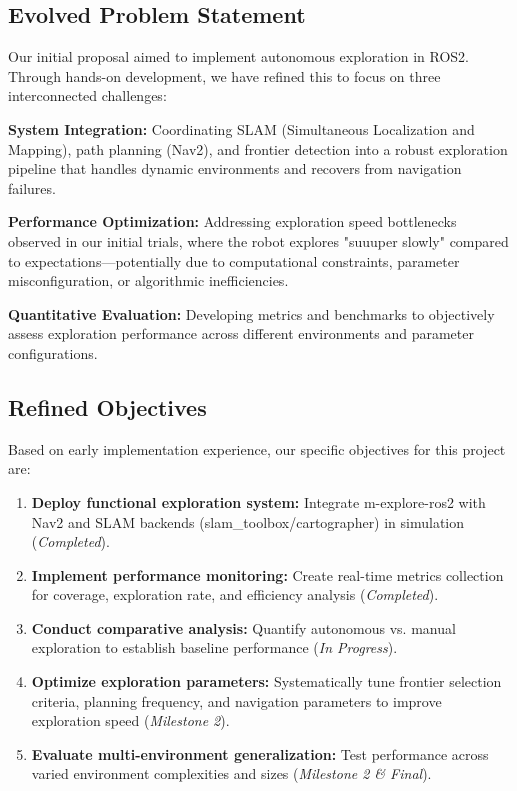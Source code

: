 \documentclass[conference]{IEEEtran}
\begin{document}
\subsection{Evolved Problem Statement}

Our initial proposal aimed to implement autonomous exploration in ROS2. Through hands-on development, we have refined this to focus on three interconnected challenges:

\textbf{System Integration:} Coordinating SLAM (Simultaneous Localization and Mapping), path planning (Nav2), and frontier detection into a robust exploration pipeline that handles dynamic environments and recovers from navigation failures.

\textbf{Performance Optimization:} Addressing exploration speed bottlenecks observed in our initial trials, where the robot explores "suuuper slowly" compared to expectations—potentially due to computational constraints, parameter misconfiguration, or algorithmic inefficiencies.

\textbf{Quantitative Evaluation:} Developing metrics and benchmarks to objectively assess exploration performance across different environments and parameter configurations.

\subsection{Refined Objectives}

Based on early implementation experience, our specific objectives for this project are:

\begin{enumerate}
\item \textbf{Deploy functional exploration system:} Integrate m-explore-ros2 with Nav2 and SLAM backends (slam\_toolbox/cartographer) in simulation (\textit{Completed}).

\item \textbf{Implement performance monitoring:} Create real-time metrics collection for coverage, exploration rate, and efficiency analysis (\textit{Completed}).

\item \textbf{Conduct comparative analysis:} Quantify autonomous vs. manual exploration to establish baseline performance (\textit{In Progress}).

\item \textbf{Optimize exploration parameters:} Systematically tune frontier selection criteria, planning frequency, and navigation parameters to improve exploration speed (\textit{Milestone 2}).

\item \textbf{Evaluate multi-environment generalization:} Test performance across varied environment complexities and sizes (\textit{Milestone 2 \& Final}).
\end{enumerate}
\end{document}
